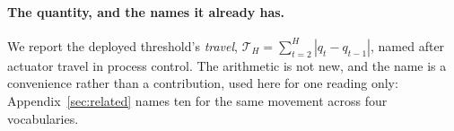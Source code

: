 \paragraph{The quantity, and the names it already has.} We report the deployed threshold's
\emph{travel}, $\mathcal{T}_H = \sum_{t=2}^{H}|q_t-q_{t-1}|$, named after actuator travel in process
control. The arithmetic is not new, and the name is a convenience rather than a contribution,
used here for one reading only: Appendix~\ref{sec:related} names ten for the same movement across
four vocabularies.

